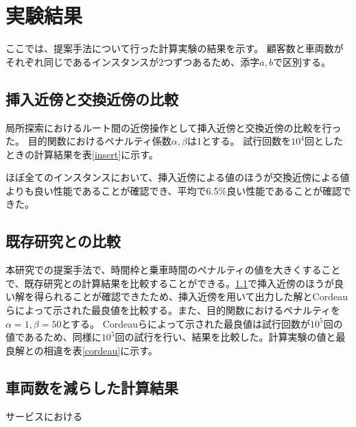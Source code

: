 \section{実験結果}
ここでは、提案手法について行った計算実験の結果を示す。
顧客数と車両数がそれぞれ同じであるインスタンスが2つずつあるため、添字$a,b$で区別する。
\subsection{挿入近傍と交換近傍の比較}
\label{sec:insert}
局所探索におけるルート間の近傍操作として挿入近傍と交換近傍の比較を行った。
目的関数におけるペナルティ係数$\alpha,\beta$は1とする。
試行回数を$10^4$回としたときの計算結果を表\ref{insert}に示す。

ほぼ全てのインスタンスにおいて、挿入近傍による値のほうが交換近傍による値よりも良い性能であることが確認でき、平均で6.5\%良い性能であることが確認できた。

\subsection{既存研究との比較}
本研究での提案手法で、時間枠と乗車時間のペナルティの値を大きくすることで、既存研究との計算結果を比較することができる。\ref{sec:insert}で挿入近傍のほうが良い解を得られることが確認できたため、挿入近傍を用いて出力した解とCordeauらによって示された最良値を比較する。また、目的関数におけるペナルティを$\alpha=1,\beta=50$とする。
Cordeauらによって示された最良値は試行回数が$10^5$回の値であるため、同様に$10^5$回の試行を行い、結果を比較した。計算実験の値と最良解との相違を表\ref{cordeau}に示す。

\subsection{車両数を減らした計算結果}
サービスにおける


